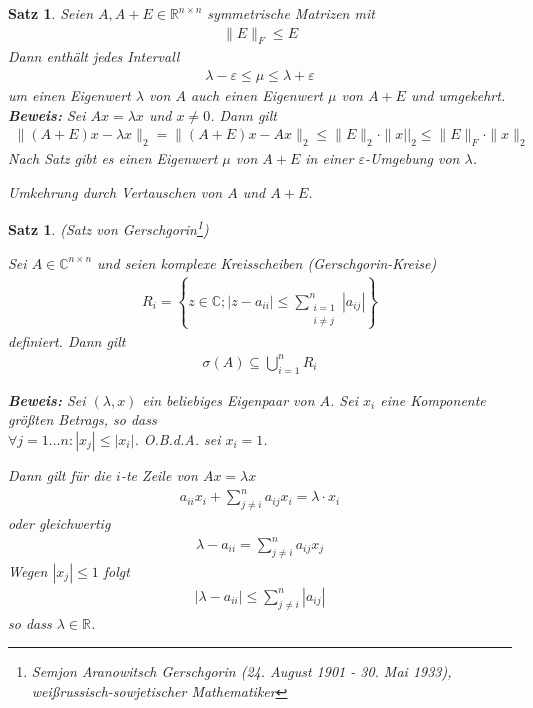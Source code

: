 \documentclass[%
a4paper,
11pt,		%
]
{scrartcl}
\newcommand{\R}{\mathbb{R}}
\newcommand{\C}{\mathbb{C}}
\theoremstyle{plain}
\theoremstyle{plain}
\newtheorem{mysatz}[mydef]{Satz}
\theoremstyle{plain}
\theoremstyle{plain}
\begin{document}
\begin{mysatz}\label{satz:ewintervall}
Seien $A, A+E \in \R^{n \times n}$ symmetrische Matrizen mit
\begin{align*}
\| E \|_F \leq E
\end{align*}
Dann enthält jedes Intervall
\begin{align*}
\lambda - \varepsilon \leq \mu \leq \lambda + \varepsilon
\end{align*}
um einen Eigenwert $\lambda$ von $A$ auch einen Eigenwert $\mu$ von $A+E$ und umgekehrt.\\

\textbf{Beweis:} Sei $Ax=\lambda x$ und $x \neq 0$. Dann gilt
\begin{align*}
\| (A+E)x - \lambda x \|_2 = \| (A+E)x - Ax \|_2 \leq \|E\|_2 \cdot \|x||_2 \leq \|E\|_F \cdot \|x\|_2
\end{align*}
Nach Satz  gibt es einen Eigenwert $\mu$ von $A+E$ in einer $\varepsilon$-Umgebung von $\lambda$.

Umkehrung durch Vertauschen von $A$ und $A+E$.
\end{mysatz}

\newpage

\begin{mysatz}(Satz von Gerschgorin\footnote{Semjon Aranowitsch Gerschgorin (24. August 1901 - 30. Mai 1933), weißrussisch-sowjetischer Mathematiker})

Sei $A \in \C^{n \times n}$ und seien komplexe Kreisscheiben \hfill (\textit{Gerschgorin-Kreise})
\begin{align*}
  R_i = \left\{ z \in \C; |z-a_{ii}| \leq \sum\limits_{\substack{i=1\\ i \neq j}}^n |a_{ij}| \right\}
\end{align*}
definiert. Dann gilt
\begin{align*}
\sigma(A) \subseteq \bigcup\limits_{i=1}^n R_i
\end{align*}

\textbf{Beweis:}
Sei $(\lambda,x)$ ein beliebiges Eigenpaar von $A$. Sei $x_i$ eine Komponente größten Betrags, so dass\\
$\forall j=1\dots n: |x_j| \leq |x_i| $. O.B.d.A. sei $x_i=1$.

Dann gilt für die $i$-te Zeile von $Ax = \lambda x$
\begin{align*}
  a_{ii} x_i + \sum\limits_{j \neq i}^n a_{ij} x_i = \lambda \cdot x_i
\end{align*}
oder gleichwertig
\begin{align*}
  \lambda - a_{ii} = \sum\limits_{j \neq i}^n a_{ij} x_j
\end{align*}
Wegen $|x_j| \leq 1$ folgt
\begin{align*}
  |\lambda - a_{ii}| \leq \sum\limits_{j \neq i}^n |a_{ij}|
\end{align*}
so dass $\lambda \in \R$.
\end{mysatz}
\end{document}
